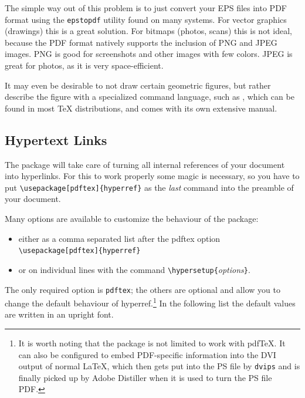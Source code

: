 The simple way out of this problem is to just convert your EPS files
into PDF format using the \texttt{epstopdf} utility found on many
systems. For vector graphics (drawings) this is a great solution. For
bitmaps (photos, scans) this is not ideal, because the PDF format
natively supports the inclusion of PNG and JPEG images. PNG is
good for screenshots and other images with few colors. JPEG is great
for photos, as it is very space-efficient.

It may even be desirable to not draw certain geometric figures, 
but rather describe the figure with a specialized command language, such as
, which can be found in most \TeX{} distributions, and
comes with its own extensive manual.

\subsection{Hypertext Links}
\label{ssec:pdfhyperref}

The  package will take care of turning all internal
references of your document into hyperlinks. For this to work
properly some magic is necessary, so you have to put
\verb+\usepackage[pdftex]{hyperref}+ as the \emph{last} command into
the preamble of your document.

Many options are available to customize the behaviour of the
 package:
\begin{itemize}
\item either as a comma separated list after the pdftex option\\
  \verb+\usepackage[pdftex]{hyperref}+
\item or on individual lines with the command
  \verb+\hypersetup{+\emph{options}\verb+}+.
\end{itemize}

The only required option is \texttt{pdftex}; the others are
optional and allow you to change the default behaviour of hyperref.\footnote{It
is worth noting that the  package is not limited to
work with pdf\TeX{}. It can also be configured to embed PDF-specific
information into the DVI output of normal \LaTeX{}, which then gets put
into the PS file by \texttt{dvips} and is finally picked up by Adobe
Distiller when it is used to turn the PS file PDF.} In the following
list the default values are written in an upright font.

